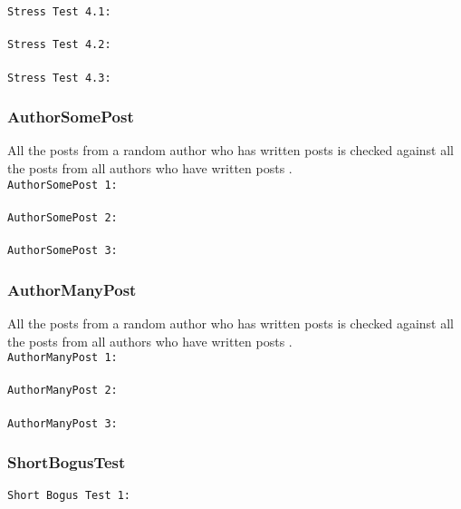\texttt{Stress Test 4.1:}\\
\\

\texttt{Stress Test 4.2:}\\
\\

\texttt{Stress Test 4.3:}\\


\subsubsection{AuthorSomePost}
All the posts from a random author who has written  posts is checked against all the posts from all authors who have written  posts .\\  

\texttt{AuthorSomePost 1:}\\
\\

\texttt{AuthorSomePost 2:}\\
\\

\texttt{AuthorSomePost 3:}\\


\subsubsection{AuthorManyPost}
All the posts from a random author who has written  posts is checked against all the posts from all authors who have written  posts .\\  

\texttt{AuthorManyPost 1:}\\
\\

\texttt{AuthorManyPost 2:}\\
\\

\texttt{AuthorManyPost 3:}\\


\subsubsection{ShortBogusTest}
\texttt{Short Bogus Test 1:}\\
\\

